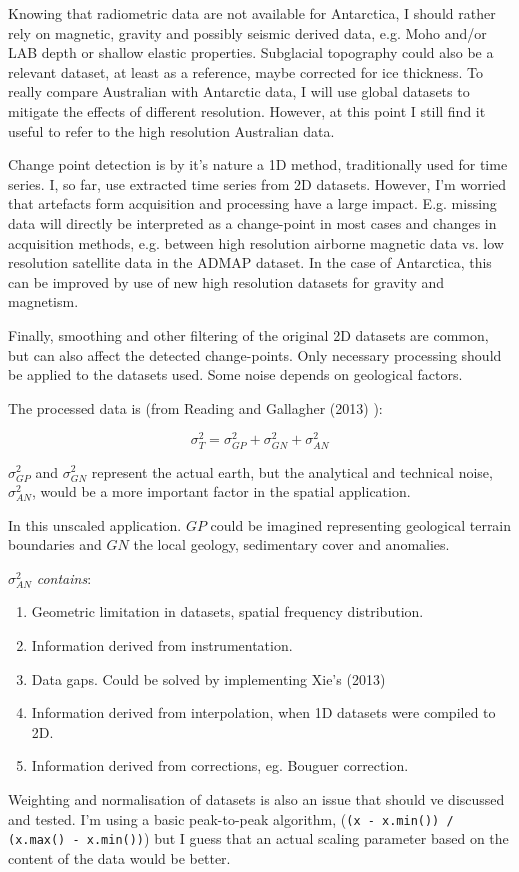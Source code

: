 
Knowing that radiometric data are not available for Antarctica, I should rather rely on magnetic, gravity and possibly seismic derived data, e.g. Moho and/or LAB depth or shallow elastic properties. Subglacial topography could also be a relevant dataset, at least as a reference, maybe corrected for ice thickness. To really compare Australian with Antarctic data, I will use global datasets to mitigate the effects of different resolution. However, at this point I still find it useful to refer to the high resolution Australian data. 

Change point detection is by it's nature a 1D method, traditionally used for time series. I, so far, use extracted time series from 2D datasets. However, I'm worried that artefacts form acquisition and processing have a large impact. E.g. missing data will directly be interpreted as a change-point in most cases and changes in acquisition methods, e.g. between high resolution airborne magnetic data vs. low resolution satellite data in the ADMAP dataset. In the case of Antarctica, this can be improved by use of new high resolution datasets for gravity and magnetism. 

Finally, smoothing and other filtering of the original 2D datasets are common, but can also affect the detected change-points. Only necessary processing should be applied to the datasets used. Some noise depends on geological factors.

The processed data is (from Reading and Gallagher (2013) \cite{Reading2013}): 

\begin{equation}
\sigma^2_{T} =\sigma^2_{GP} + \sigma^2_{GN}  + \sigma^2_{AN}
\end{equation}

$\sigma^2_{GP} $ and $\sigma^2_{GN} $ represent the actual earth, but the analytical and technical noise, $\sigma^2_{AN}$, would be a more important factor in the spatial application. 

In this unscaled application. $GP$ could be imagined representing geological terrain boundaries and $GN$ the local geology, sedimentary cover and anomalies. 

$\sigma^2_{AN}$  \textit{contains}:
\begin{enumerate}
	
	\item Geometric limitation in datasets, spatial frequency distribution.
	\item Information derived from instrumentation. 
	\item Data gaps. Could be solved by implementing Xie's (2013) \cite{Xie2013}
	\item Information derived from interpolation, when 1D datasets were compiled to 2D.
	\item Information derived from corrections, eg. Bouguer correction. 

\end{enumerate}

Weighting and normalisation of datasets is also an issue that should ve discussed and tested. I'm using a basic peak-to-peak algorithm, (\texttt{(x - x.min()) / (x.max() - x.min())}) but I guess that an actual scaling parameter based on the content of the data would be better. 


